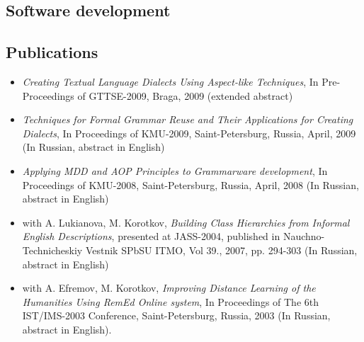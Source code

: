 \documentclass[a4paper, 12pt]{article}
\begin{document}
\subsection*{Software development}

\subsection*{Publications}
\begin{itemize}
	\item {\it Creating Textual Language Dialects Using Aspect-like Techniques}, In Pre-Proceedings of GTTSE-2009, Braga, 2009 (extended abstract)
	\item {\it Techniques for Formal Grammar Reuse and Their Applications for Creating Dialects}, In Proceedings of KMU-2009, Saint-Petersburg, Russia, April, 2009 (In Russian, abstract in English)
	\item {\it Applying MDD and AOP Principles to Grammarware development}, In Proceedings of KMU-2008, Saint-Petersburg, Russia, April, 2008 (In Russian, abstract in English)
	\item with A. Lukianova, M. Korotkov, {\it Building Class Hierarchies from Informal English Descriptions}, presented at JASS-2004, published in Nauchno-Technicheskiy Vestnik SPbSU ITMO, Vol 39., 2007, pp. 294-303 (In Russian, abstract in English)
	\item with A. Efremov, M. Korotkov, {\it Improving Distance Learning of the Humanities Using {\it RemEd} Online system}, In Proceedings of The 6th IST/IMS-2003 Conference, Saint-Petersburg, Russia, 2003 (In Russian, abstract in English).
\end{itemize}
\end{document}
